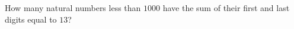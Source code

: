 How many natural numbers less than $1000$ have the sum of their first and last digits equal to $13$?
